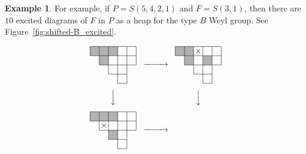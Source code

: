 \documentclass[10pt]{amsart}
\theoremstyle{definition}
\newtheorem{exam}[theo]{Example}
\theoremstyle{remark}
\begin{document}
\begin{exam}
For example, if $P = S(5,4,2,1)$ and $F = S(3,1)$, 
then there are $10$ excited diagrams of $F$ in $P$ as a heap for the type $B$ Weyl group.
See Figure~\ref{fig:shifted-B_excited}.
\begin{figure}[!htb]
$$
\setlength{\unitlength}{1.1pt}
\begin{CD}
\raisebox{-20pt}{
\begin{picture}(50,40)
\fboxsep=0mm
\put(0,30){\colorbox[gray]{0.7}{\makebox(10,10){}}}
\put(10,30){\colorbox[gray]{0.7}{\makebox(10,10){}}}
\put(20,30){\colorbox[gray]{0.7}{\makebox(10,10){}}}
\put(10,20){\colorbox[gray]{0.7}{\makebox(10,10){}}}
\put(0,40){\line(1,0){50}}
\put(0,30){\line(1,0){50}}
\put(10,20){\line(1,0){40}}
\put(20,10){\line(1,0){20}}
\put(30,0){\line(1,0){10}}
\put(0,30){\line(0,1){10}}
\put(10,20){\line(0,1){20}}
\put(20,10){\line(0,1){30}}
\put(30,0){\line(0,1){40}}
\put(40,0){\line(0,1){40}}
\put(50,20){\line(0,1){20}}
\end{picture}
}
@>>>
\raisebox{-20pt}{
\begin{picture}(50,40)
\fboxsep=0mm
\put(0,30){\colorbox[gray]{0.7}{\makebox(10,10){}}}
\put(10,30){\colorbox[gray]{0.7}{\makebox(10,10){}}}
\put(30,20){\colorbox[gray]{0.7}{\makebox(10,10){}}}
\put(10,20){\colorbox[gray]{0.7}{\makebox(10,10){}}}
\put(0,40){\line(1,0){50}}
\put(0,30){\line(1,0){50}}
\put(10,20){\line(1,0){40}}
\put(20,10){\line(1,0){20}}
\put(30,0){\line(1,0){10}}
\put(0,30){\line(0,1){10}}
\put(10,20){\line(0,1){20}}
\put(20,10){\line(0,1){30}}
\put(30,0){\line(0,1){40}}
\put(40,0){\line(0,1){40}}
\put(50,20){\line(0,1){20}}
\put(20,30){\makebox(10,10){$\times$}}
\end{picture}
}
\\[5pt]
@VVV
@VVV
\\[5pt]
\raisebox{-20pt}{
\begin{picture}(50,40)
\fboxsep=0mm
\put(0,30){\colorbox[gray]{0.7}{\makebox(10,10){}}}
\put(10,30){\colorbox[gray]{0.7}{\makebox(10,10){}}}
\put(20,30){\colorbox[gray]{0.7}{\makebox(10,10){}}}
\put(20,10){\colorbox[gray]{0.7}{\makebox(10,10){}}}
\put(0,40){\line(1,0){50}}
\put(0,30){\line(1,0){50}}
\put(10,20){\line(1,0){40}}
\put(20,10){\line(1,0){20}}
\put(30,0){\line(1,0){10}}
\put(0,30){\line(0,1){10}}
\put(10,20){\line(0,1){20}}
\put(20,10){\line(0,1){30}}
\put(30,0){\line(0,1){40}}
\put(40,0){\line(0,1){40}}
\put(50,20){\line(0,1){20}}
\put(10,20){\makebox(10,10){$\times$}}
\end{picture}
}
@>>>
\raisebox{-20pt}{
\begin{picture}(50,40)
\fboxsep=0mm

\end{picture}}
\end{CD}$$
\end{figure}
\end{exam}
\end{document}

